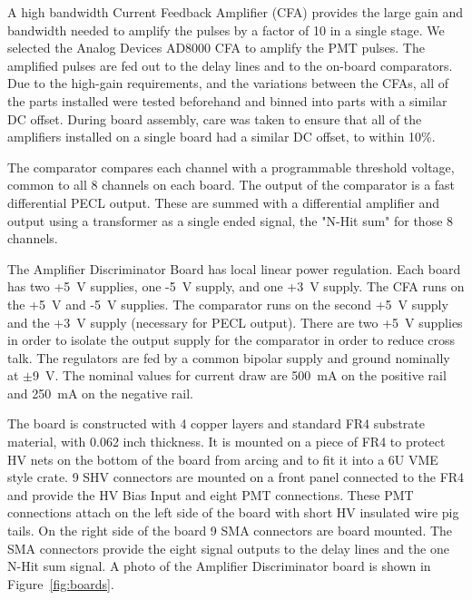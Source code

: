 \documentclass{JINST}
\begin{document}
A high bandwidth Current Feedback Amplifier (CFA) provides the large
gain and bandwidth needed to amplify the pulses by a factor of 10 in a
single stage.  We selected the Analog Devices AD8000 CFA to amplify
the PMT pulses.  The amplified pulses are fed out to the delay
lines and to the on-board comparators.  Due to the high-gain
requirements, and the variations between the CFAs, all of the parts
installed were tested beforehand and binned into parts with a similar
DC offset.  During board assembly, care was taken to ensure that all
of the amplifiers installed on a single board had a similar DC offset,
to within 10\%.

The comparator compares each channel with a programmable threshold
voltage, common to all 8 channels on each board.  The output of the
comparator is a fast differential PECL output.  These are summed with
a differential amplifier and output using a transformer as a single
ended signal, the "N-Hit sum" for those 8 channels.

The Amplifier Discriminator Board has local linear power regulation.
Each board has two +5~V supplies, one -5~V supply, and one +3~V supply.
The CFA runs on the +5~V and -5~V supplies.  The comparator runs on the
second +5~V supply and the +3~V supply (necessary for PECL output).
There are two +5~V supplies in order to isolate the output supply for
the comparator in order to reduce cross talk.  The regulators are fed
by a common bipolar supply and ground nominally at $\pm$9~V.  The
nominal values for current draw are 500~mA on the positive rail and
250~mA on the negative rail.

The board is constructed with 4 copper layers and standard FR4
substrate material, with 0.062 inch thickness.  It is mounted on a piece
of FR4 to protect HV nets on the bottom of the board from arcing and
to fit it into a 6U VME style crate.  9 SHV connectors are mounted on
a front panel connected to the FR4 and provide the HV Bias Input and
eight PMT connections.  These PMT connections attach on the left side
of the board with short HV insulated wire pig tails.  On the right
side of the board 9 SMA connectors are board mounted.  The SMA
connectors provide the eight signal outputs to the delay lines and the
one N-Hit sum signal.  A photo of the Amplifier Discriminator
board is shown in Figure~\ref{fig:boards}.
\end{document}
